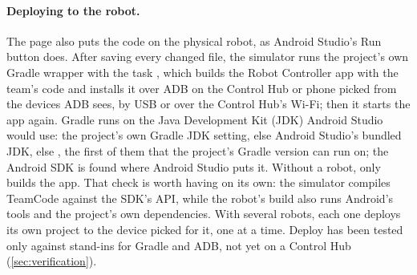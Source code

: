 \documentclass[10pt,twocolumn,letterpaper]{article}
\begin{document}
\paragraph{Deploying to the robot.} The page also puts the code on the physical robot, as Android Studio's Run button does. After saving every changed file, the simulator runs the project's own Gradle wrapper with the task , which builds the Robot Controller app with the team's code and installs it over ADB \citep{android2026adb} on the Control Hub or phone picked from the devices ADB sees, by USB or over the Control Hub's Wi-Fi; then it starts the app again. Gradle runs on the Java Development Kit (JDK) Android Studio would use: the project's own Gradle JDK setting, else Android Studio's bundled JDK, else , the first of them that the project's Gradle version can run on; the Android SDK is found where Android Studio puts it. Without a robot,  only builds the app. That check is worth having on its own: the simulator compiles TeamCode against the SDK's API, while the robot's build also runs Android's tools and the project's own dependencies. With several robots, each one deploys its own project to the device picked for it, one at a time. Deploy has been tested only against stand-ins for Gradle and ADB, not yet on a Control Hub (\cref{sec:verification}).
\end{document}
